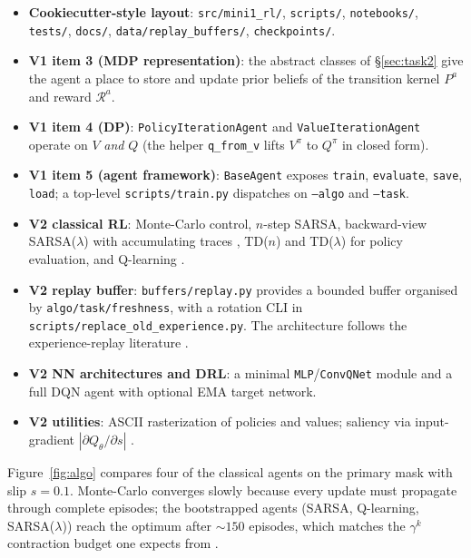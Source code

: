\documentclass[11pt]{article}
\begin{document}
\begin{itemize}[leftmargin=2em, itemsep=2pt]
  \item \textbf{Cookiecutter-style layout}: \texttt{src/mini1\_rl/},
    \texttt{scripts/}, \texttt{notebooks/}, \texttt{tests/},
    \texttt{docs/}, \texttt{data/replay\_buffers/}, \texttt{checkpoints/}.
  \item \textbf{V1 item 3 (MDP representation)}: the abstract classes of
    \S\ref{sec:task2} give the agent a place to store and update prior
    beliefs of the transition kernel $P^a$ and reward $\mathcal{R}^a$.
  \item \textbf{V1 item 4 (DP)}: \texttt{PolicyIterationAgent} and
    \texttt{ValueIterationAgent} operate on $V$ \emph{and} $Q$ (the
    helper \texttt{q\_from\_v} lifts $V^\pi$ to $Q^\pi$ in closed form).
  \item \textbf{V1 item 5 (agent framework)}:
    \texttt{BaseAgent} exposes \texttt{train}, \texttt{evaluate},
    \texttt{save}, \texttt{load}; a top-level \texttt{scripts/train.py}
    dispatches on \texttt{--algo} and \texttt{--task}.
  \item \textbf{V2 classical RL}: Monte-Carlo control, $n$-step SARSA,
    backward-view SARSA($\lambda$) with accumulating traces
    \citep{dayan1993}, TD($n$) and TD($\lambda$) for policy evaluation,
    and Q-learning \citep{watkins1992}.
  \item \textbf{V2 replay buffer}: \texttt{buffers/replay.py} provides a
    bounded buffer organised by \texttt{algo/task/freshness}, with a
    rotation CLI in \texttt{scripts/replace\_old\_experience.py}. The
    architecture follows the experience-replay literature
    \citep{lin1992,mnih2015}.
  \item \textbf{V2 NN architectures and DRL}: a minimal
    \texttt{MLP}/\texttt{ConvQNet} module and a full DQN agent
    \citep{mnih2015} with optional EMA target network.
  \item \textbf{V2 utilities}: ASCII rasterization of policies and
    values; saliency via input-gradient $|\partial
    Q_\theta/\partial s|$ \citep{simonyan2014saliency}.
\end{itemize}

Figure~\ref{fig:algo} compares four of the classical agents on the
primary mask with slip $s = 0.1$. Monte-Carlo converges slowly because
every update must propagate through complete episodes; the bootstrapped
agents (SARSA, Q-learning, SARSA($\lambda$)) reach the optimum after
$\sim\!150$ episodes, which matches the $\gamma^k$ contraction budget
one expects from \citet{sutton2018}.
\end{document}
